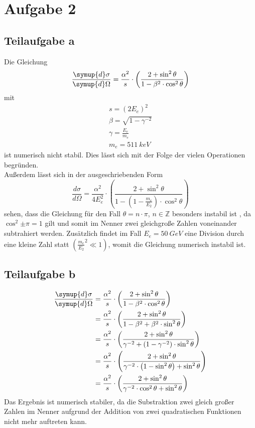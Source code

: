 \section{Aufgabe 2}
\subsection{Teilaufgabe a}
Die Gleichung
\begin{equation}
  \frac{\symup{d} \sigma}{\symup{d} \Omega}=\frac{\alpha ^2}{s} \cdot \left(\frac{2+\sin^2{\theta}}{1-\beta^2 \cdot \cos^2{\theta}} \right)
\end{equation}
mit
\begin{align*}
  s=\left( 2E_e\right)^2 \\
  \beta=\sqrt{1-\gamma^{-2}} \\
  \gamma=\frac{E_e}{m_e} \\
  m_e= \SI{511}{keV}
\end{align*}
ist numerisch nicht stabil. Dies lässt sich mit der Folge der vielen Operationen begründen. \\
Außerdem lässt sich in der ausgeschriebenden Form
\begin{equation}
  \frac{d \sigma}{d \Omega}=\frac{\alpha ^2}{4E^2_{e}} \cdot \left(\frac{2+\sin^2{\theta}}{1-\left(1-\frac{m_{e}}{E_{2}} \right) \cdot \cos^2{\theta}} \right)
\end{equation}
sehen, dass die Gleichung für den Fall $\theta = n \cdot \pi$, $n \in \mathbb{Z}$ besonders instabil ist , da
$\cos^2{\pm \pi}=1$ gilt und somit im Nenner  zwei gleichgroße Zahlen voneinander subtrahiert werden.
Zusätzlich findet im Fall $E_e=\SI{50}{GeV}$ eine Division durch eine kleine Zahl statt $\left( {\frac{m_{e}}{E_{2}}}^2 \ll 1 \right)$, womit die Gleichung numerisch instabil ist.


\subsection{Teilaufgabe b} \label{sec:2b}

\begin{align}
  \frac{\symup{d} \sigma}{\symup{d} \Omega} &= \frac{\alpha ^2}{s} \cdot \left(\frac{2+\sin^2{\theta}}{1-\beta^2 \cdot \cos^2{\theta}} \right) \\
  &=\frac{\alpha ^2}{s} \cdot \left(\frac{2+\sin^2{\theta}}{1-\beta^2 + \beta^2 \cdot \sin^2{\theta}} \right) \\
  &=\frac{\alpha ^2}{s} \cdot \left(\frac{2+\sin^2{\theta}}{\gamma^{-2} + \left(1-\gamma^{-2} \right) \cdot \sin^2{\theta}} \right) \\
  &=\frac{\alpha ^2}{s} \cdot \left(\frac{2+\sin^2{\theta}}{\gamma^{-2} \cdot \left(1-\sin^{2}{\theta} \right) + \sin^2{\theta}} \right) \\
  &=\frac{\alpha ^2}{s} \cdot \left(\frac{2+\sin^2{\theta}}{\gamma^{-2} \cdot \cos^2{\theta} + \sin^2{\theta}} \right)  \label{eqn:dwqsb}\\
\end{align}
Das Ergebnis ist numerisch stabiler, da die Substraktion zwei gleich großer Zahlen im Nenner aufgrund der Addition von zwei quadratischen Funktionen nicht mehr auftreten kann.

